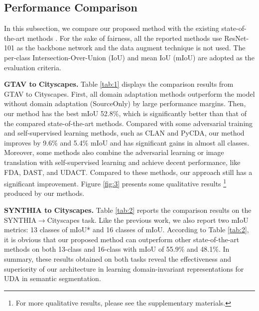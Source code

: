 \documentclass[sigconf]{acmart}
\begin{document}
\subsection{Performance Comparison}



\par In this subsection, we compare our proposed method with the existing state-of-the-art methods \cite{tsai2018learning,vu2019advent,luo2019taking,li2019bidirectional,tsai2019domain,lian2019constructing,pan2020unsupervised,kim2020learning,yang2020fda,wang2020classes,yang2020label,li2020content,yu2021dast,lee2020unsupervised}. For the sake of fairness, all the reported methods use ResNet-101 as the backbone network and the data augment technique is not used. The per-class Intersection-Over-Union (IoU) and mean IoU (mIoU) are adopted as the evaluation criteria.

\par \textbf{GTAV to Cityscapes.} Table \ref{tab:1} displays the comparison results from GTAV to Cityscapes. First, all domain adaptation methods outperform the model without domain adaptation (SourceOnly) by large performance margins. Then, our method has the best mIoU 52.8$\%$, which is significantly better than that of the compared state-of-the-art methods. Compared with some adversarial training and self-supervised learning methods, such as CLAN and PyCDA, our method improves by 9.6$\%$ and 5.4$\%$ mIoU and has significant gains in almost all classes. Moreover, some methods also combine the adversarial learning or image translation with self-supervised learning and achieve decent performance, like FDA, DAST, and UDACT. Compared to these methods, our approach still has a significant improvement. Figure \ref{fig:3} presents some qualitative results \footnote{For more qualitative results, please see the supplementary materials.} produced by our methods. 


\par \textbf{SYNTHIA to Cityscapes.} Table \ref{tab:2} reports the comparison results on the SYNTHIA$\rightarrow$Cityscapes task. Like the previous work, we also report two mIoU metrics: 13 classes of mIoU* and 16 classes of mIoU. According to Table \ref{tab:2}, it is obvious that our proposed method can outperform other state-of-the-art methods on both 13-class and 16-class with mIoU of 55.9$\%$ and 48.1$\%$. In summary, these results obtained on both tasks reveal the effectiveness and superiority of our architecture in learning domain-invariant representations for UDA in semantic segmentation.
\end{document}
